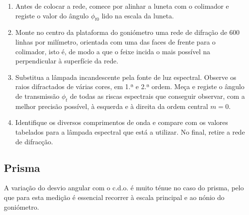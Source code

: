 \documentclass[a4paper,twoside,11pt]{report}      %
\begin{document}
\begin{enumerate}[resume]
\item Antes de colocar a rede, comece por alinhar a luneta com o colimador e registe o valor do ângulo $\phi_{t0}$ lido na escala da luneta.
\item Monte no centro da plataforma do goniómetro uma rede de difração de 600 linhas por milímetro, orientada com uma das faces de frente para o colimador, isto é, de modo a que o feixe incida o mais possível na perpendicular à superfície da rede.
\item Substitua a lâmpada incandescente pela fonte de luz espectral. Observe os raios difractados de várias cores, em 1.ª e 2.ª ordem. Meça e registe o ângulo de transmissão $\phi_t$ de todas as riscas espectrais que conseguir observar, com a melhor precisão possível, à esquerda e à direita da ordem central $m=0$.
\item Identifique os diversos comprimentos de onda e compare com os valores tabelados para a lâmpada espectral que está a utilizar. No final, retire a rede de difracção.
\end{enumerate}

\subsection*{\sf Prisma}
A variação do desvio angular com o c.d.o. é muito ténue no caso do prisma, pelo que para esta medição é essencial recorrer à escala principal e ao nónio do goniómetro. 
\end{document}
